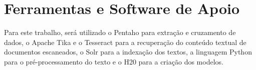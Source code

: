 
\section{Ferramentas e Software de Apoio}%

Para este trabalho, será utilizado o Pentaho para extração e cruzamento de dados, o Apache Tika e o Tesseract para a recuperação do conteúdo textual de documentos escaneados, o Solr para a indexação dos textos, a linguagem Python para o pré-processamento do texto e o H20 para a criação dos modelos.


